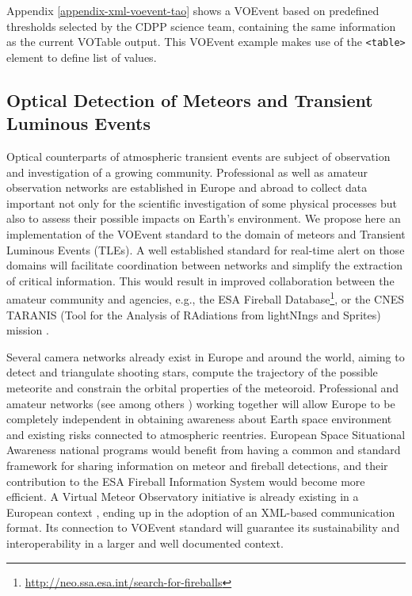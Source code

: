 \documentclass[referee,a4paper,12pt,traditabstract]{swsc}
\begin{document}
\begin{linenumbers}
Appendix \ref{appendix-xml-voevent-tao} shows a VOEvent based on predefined thresholds selected by the CDPP science team, containing the same information as the current VOTable output. This VOEvent example makes use of the {\tt <table>} element to define list of values.

\subsection{Optical Detection of Meteors and Transient Luminous Events}
Optical counterparts of atmospheric transient events are subject of observation and investigation of a growing community. Professional as well as amateur observation networks are established in Europe and abroad to collect data important not only for the scientific investigation of some physical processes but also to assess their possible impacts on Earth's environment. We propose here an implementation of the VOEvent standard to the domain of meteors and Transient Luminous Events (TLEs). A well established standard for real-time alert on those domains will facilitate coordination between networks and simplify the extraction of critical information. This would result in improved collaboration between the amateur community and agencies, e.g., the ESA Fireball Database\footnote{\url{http://neo.ssa.esa.int/search-for-fireballs}}, or the CNES TARANIS (Tool for the Analysis of RAdiations from lightNIngs and Sprites) mission \cite{2007AdSpR..40.1268B}. 

Several camera networks already exist in Europe and around the world, aiming to detect and triangulate shooting stars, compute the trajectory of the possible meteorite and constrain the orbital properties of the meteoroid. Professional and amateur networks (see among others \cite{1998M&PS...33...49O, 2015EPSC...10..800C, 2016pimo.conf...76G, 2013pimo.conf..125J}) working together will allow Europe to be completely independent in obtaining awareness about Earth space environment and existing risks connected to atmospheric reentries. European Space Situational Awareness national programs would benefit from having a common and standard framework for sharing information on meteor and fireball detections, and their contribution to the ESA Fireball Information System would become more efficient. A Virtual Meteor Observatory initiative is already existing in a European context \cite{2008EM&P..102..247K, 2010JIMO...38...10B}, ending up in the adoption of an XML-based communication format. Its connection to VOEvent standard will guarantee its sustainability and interoperability in a larger and well documented context.


\end{linenumbers}
\end{document}
